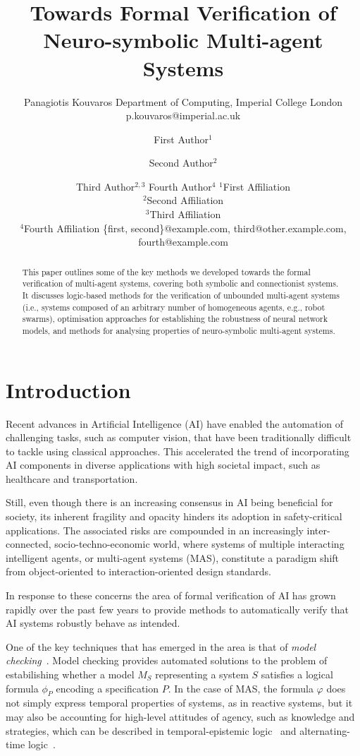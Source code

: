\documentclass{article}
\title{Towards Formal Verification of Neuro-symbolic Multi-agent Systems}
\author{
    Panagiotis Kouvaros
    \affiliations
    Department of Computing, Imperial College London
    \emails
    p.kouvaros@imperial.ac.uk
}
\author{
First Author$^1$
\and
Second Author$^2$\and
Third Author$^{2,3}$\And
Fourth Author$^4$
\affiliations
$^1$First Affiliation\\
$^2$Second Affiliation\\
$^3$Third Affiliation\\
$^4$Fourth Affiliation
\emails
\{first, second\}@example.com,
third@other.example.com,
fourth@example.com
}
\begin{document}
\maketitle

\begin{abstract}

This paper outlines some of the key methods we developed towards the formal
verification of multi-agent systems, covering both symbolic and connectionist
systems.  It discusses logic-based methods for the verification of unbounded
multi-agent systems (i.e., systems composed of an arbitrary number of
homogeneous agents, e.g., robot swarms), optimisation approaches for
establishing the robustness of neural network models, and methods for analysing
properties of neuro-symbolic multi-agent systems.

\end{abstract}

\section{Introduction}

Recent advances in Artificial Intelligence (AI) have enabled the automation of
challenging tasks, such as computer vision, that have been traditionally
difficult to tackle using classical approaches.  This accelerated the trend of
incorporating AI components in  diverse applications with high societal impact,
such as healthcare and transportation. 

Still, even though there is an increasing consensus in AI being beneficial for
society,  its inherent fragility and opacity hinders its adoption in
safety-critical applications. The associated risks are compounded in an
increasingly inter-connected, socio-techno-economic world, where systems of
multiple interacting intelligent agents, or multi-agent systems (MAS),
constitute a paradigm shift from object-oriented to interaction-oriented design
standards. 

In response to these concerns the area of formal verification of AI has grown
rapidly over the past few years to provide methods to automatically verify that
AI systems robustly behave as intended.

One of the key techniques that has emerged in the area is that of {\em model
checking}~\cite{Clarke+99a}. Model checking provides automated solutions to 
the problem of estabilishing whether a model $M_S$ representing a system $S$ satisfies a
logical formula $\phi_P$ encoding a specification $P$. In the case of MAS,
the formula $\varphi$ does not simply express temporal properties of systems, as
in reactive systems, but it may also be accounting for high-level attitudes of
agency, such as knowledge and strategies, which can be described in
temporal-epistemic logic~\cite{Fagin+95b} and alternating-time
logic~\cite{Alur+98a}.
\end{document}
